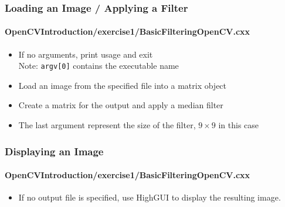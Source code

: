 \begin{frame}
\frametitle{Loading an Image / Applying a Filter}
\framesubtitle{OpenCVIntroduction/exercise1/BasicFilteringOpenCV.cxx}
\begin{center}
\begin{itemize}
\item If no arguments, print usage and exit \\
Note: {\tt argv[0]} contains the executable name
\pause
\item Load an image from the specified file into a matrix object
\pause
\item Create a matrix for the output and apply a median filter
\item The last argument represent the size of the filter, $9\times9$ in this case
\end{itemize}
\end{center}
\end{frame}


\begin{frame}
\frametitle{Displaying an Image}
\framesubtitle{OpenCVIntroduction/exercise1/BasicFilteringOpenCV.cxx}
\begin{center}
\begin{itemize}
\item If no output file is specified, use HighGUI to display the resulting image.
\end{itemize}
\end{center}
\end{frame}



